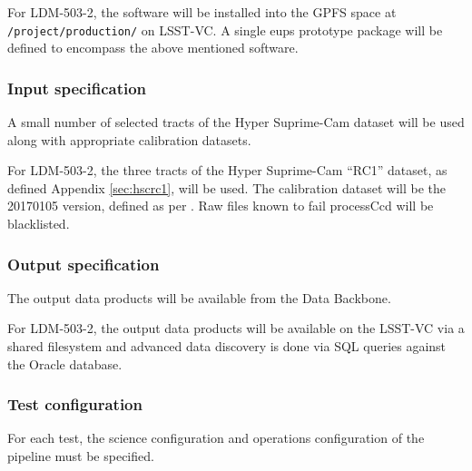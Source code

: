 For LDM-503-2, the software will be installed into the GPFS space
at \texttt{/project/production/} on LSST-VC.  A single eups prototype
package will be defined to encompass the above mentioned software.

\subsubsection{Input specification}\label{sec:input}

A small number of selected tracts of the Hyper Suprime-Cam dataset will be used along with appropriate calibration datasets.

For LDM-503-2, the three tracts of the Hyper Suprime-Cam ``RC1'' dataset, as
defined Appendix \ref{sec:hscrc1}, will be used. The calibration dataset
will be the 20170105 version, defined as per . Raw files known
to fail processCcd will be blacklisted.

\subsubsection{Output specification}

The output data products will be available from the Data Backbone.

For LDM-503-2, the output data products will be available on the LSST-VC via a shared filesystem and advanced data discovery is done via SQL queries against the Oracle database.


\subsubsection{Test configuration}\label{sec:configuration}

For each test, the science configuration and operations configuration of the pipeline must be specified.

